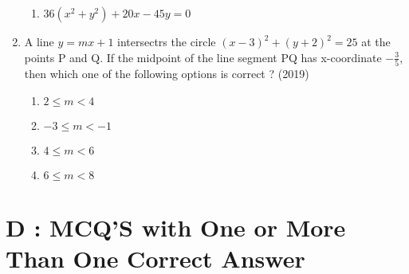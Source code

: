 \documentclass[12pt]{article}
\begin{document}
\begin{enumerate}
\begin{enumerate}
\item $36(x^2+y^2)+20x-45y=0$
\end{enumerate}
\item A line $y=mx+1$ intersectrs the circle $(x-3)^2+(y+2)^2=25$ at the points P and Q. If the midpoint of the line segment PQ has x-coordinate $-\frac{3}{5}$, then which one of the following options is correct ? (2019)
\begin{enumerate}
\item $2\leq m<4$
\item $-3\leq m<-1$
\item $4\leq m<6$
\item $6\leq m<8$
\end{enumerate}
\end{enumerate}
\section*{D  :  MCQ'S with One or More Than One Correct Answer}
\end{document}

